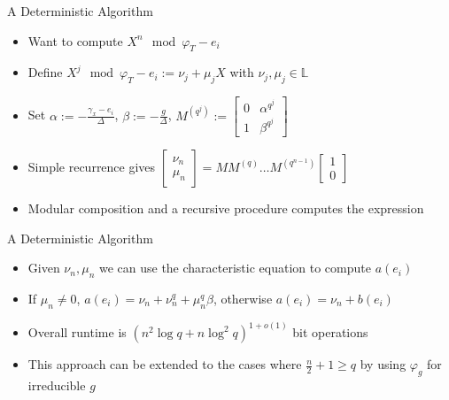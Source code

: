 \documentclass{beamer}
\begin{document}

\begin{frame}{A Deterministic Algorithm}
\begin{itemize}
    \item Want to compute $X^n \mod \varphi_{T} - e_i$
    \item Define $X^j \mod \varphi_{T} - e_i := \nu_j + \mu_j X $ with $\nu_j, \mu_j \in \mathbb{L}$
    
    \item Set $\alpha := -\frac{\gamma_x - e_i}{\Delta}$, $\beta := - \frac{g}{\Delta}$, $M^{(q^j)} := \begin{bmatrix} 0 & \alpha^{q^j} \\ 1 & \beta^{q^j} \end{bmatrix}$
    
    \item Simple recurrence gives $\begin{bmatrix} \nu_{n} \\ \mu_n  \end{bmatrix} = M M^{(q)} \ldots M^{(q^{n-1})}  \begin{bmatrix} 1 \\ 0  \end{bmatrix}$
    
    \item Modular composition and a recursive procedure computes the expression 
    
    
    
\end{itemize}
    
\end{frame}


\begin{frame}{A Deterministic Algorithm}
\begin{itemize}
    \item Given $\nu_n, \mu_n$ we can use the characteristic equation to compute $a(e_i)$
        \item If $\mu_n \neq 0$, $a(e_i) = \nu_n + \nu_n^q + \mu_n^q \beta$, otherwise $a(e_i) = \nu_n + b(e_i)$
    \item Overall runtime is $(n^2 \log q + n \log^2 q)^{1+o(1)}$ bit operations

    \item This approach can be extended to the cases where $\frac{n}{2} + 1 \geq q$ by using $\varphi_{g}$ for irreducible $g$
\end{itemize}
    
\end{frame}
\end{document}

